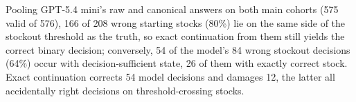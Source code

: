 Pooling GPT-5.4 mini's raw and canonical answers on both main cohorts (575 valid of 576), 166 of 208 wrong starting stocks (80\%) lie on the same side of the stockout threshold as the truth, so exact continuation from them still yields the correct binary decision; conversely, 54 of the model's 84 wrong stockout decisions (64\%) occur with decision-sufficient state, 26 of them with exactly correct stock. Exact continuation corrects 54 model decisions and damages 12, the latter all accidentally right decisions on threshold-crossing stocks. 
